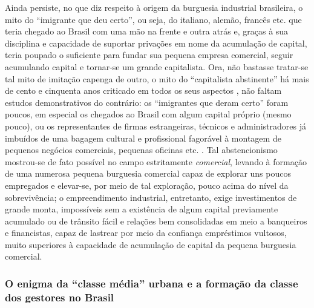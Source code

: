 Ainda persiste, no que diz respeito à origem da burguesia industrial brasileira, o mito do ``imigrante que deu certo'', ou seja, do italiano, alemão, francês etc. que teria chegado ao Brasil com uma mão na frente e outra atrás e, graças à sua disciplina e capacidade de suportar privações em nome da acumulação de capital, teria poupado o suficiente para fundar sua pequena empresa comercial, seguir acumulando capital e tornar-se um grande capitalista. Ora, não bastasse tratar-se tal mito de imitação capenga de outro, o mito do ``capitalista abstinente'' há mais de cento e cinquenta anos criticado em todos os seus aspectos \cite[pp.~689-697]{marx_capital1vol2_2001}, não faltam estudos demonstrativos do contrário: os ``imigrantes que deram certo'' foram poucos, em especial os chegados ao Brasil com algum capital próprio (mesmo pouco), ou os representantes de firmas estrangeiras, técnicos e administradores já imbuídos de uma bagagem cultural e profissional fagorável à montagem de pequenos negócios comerciais, pequenas oficinas etc. \cite{dean_indussp_1971,gorender_burguesia_1990}. Tal abstencionismo mostrou-se de fato possível no campo estritamente \textit{comercial}, levando à formação de uma numerosa pequena burguesia comercial capaz de explorar uns poucos empregados e elevar-se, por meio de tal exploração, pouco acima do nível da sobrevivência; o empreendimento industrial, entretanto, exige investimentos de grande monta, impossíveis sem a existência de algum capital previamente acumulado ou de trânsito fácil e relações bem consolidadas em meio a banqueiros e financistas, capaz de lastrear por meio da confiança empréstimos vultosos, muito superiores à capacidade de acumulação de capital da pequena burguesia comercial.

\subsubsection{O enigma da ``classe média'' urbana e a formação da classe dos gestores no Brasil}\label{subsubsec:clamed}

